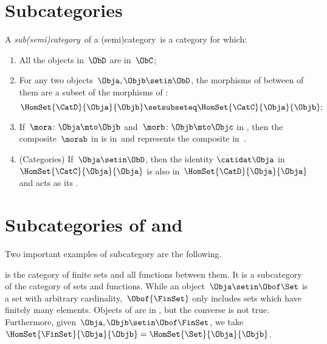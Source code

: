 
\section{Subcategories}
\label{sec:subcategories}


\begin{ctdefinition}[Subcategory]
    \label{def:subcategory}
    A \emph{sub(semi)category}~\CatD of a (semi)category~\CatC is a category for which:
    \begin{enumerate}
        \item All the objects in~$\ObD$ are in~$\ObC$;
        \item For any two objects~$\Obja,\Objb\setin \ObD$,
              the morphisms of \CatD between of them are a subset of the morphisms of \CatC:
              \begin{equation}
                  \HomSet{\CatD}{\Obja}{\Objb}\setsubseteq \HomSet{\CatC}{ \Obja}{\Objb};
              \end{equation}
        \item If~$\mora \colon \Obja \mto \Objb$ and~$\morb\colon \Objb\mto \Objc$ in \CatD, then the composite~$\morab$ in \CatC is in~\CatD and represents the composite in~\CatD.
        \item (Categories) If~$\Obja\setin \ObD$, then the identity $\catidat\Obja$ in $\HomSet{\CatC}{\Obja}{\Obja}$ is also in~$\HomSet{\CatD}{\Obja}{\Obja}$ and acts as its .
    \end{enumerate}
\end{ctdefinition}

\section{Subcategories of \Rel and \Set}

Two important examples of subcategory are the following.

\begin{example}[\FinSet]
    \label{ex:FinSet}
    \FinSet is the category of finite sets and all functions between them.
    It is a subcategory of the category \Set of sets and functions.
    While an object~$\Obja \setin \Obof\Set$ is a set with arbitrary cardinality,~$\Obof{\FinSet}$ only includes sets which have finitely many elements.
    Objects of \FinSet are in \Set, but the converse is not true.
    Furthermore, given~$\Obja,\Objb\setin \Obof\FinSet$, we take~$\HomSet{\FinSet}{\Obja}{\Objb} =\HomSet{\Set}{\Obja}{\Objb}$.
\end{example}


